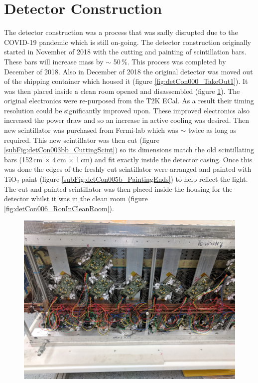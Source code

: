 \section{Detector Construction}\label{sec:DetectorConstruction}
The detector construction was a process that was sadly disrupted due to the COVID-19 pandemic which is still on-going. The detector construction originally started in November of 2018 with the cutting and painting of scintillation bars. These bars will increase mass by $\sim$ 50\,\%. This process was completed by December of 2018. Also in December of 2018 the original detector was moved out of the shipping container which housed it (figure \ref{fig:detCon000_TakeOut1}). It was then placed inside a clean room opened and disassembled (figure \ref{fig:detCon002_OldTearAway}). The original electronics were re-purposed from the T2K ECal. As a result their timing resolution could be significantly improved upon. These improved electronics also increased the power draw and so an increase in active cooling was desired. Then new scintillator was purchased from Fermi-lab which was $\sim$ twice as long as required. This new scintillator was then cut (figure \ref{subFig:detCon003bb_CuttingScint}) so its dimensions match the old scintillating bars (152\,cm $\times$ 4\,cm $\times$ 1\,cm) and fit exactly inside the detector casing. Once this was done the edges of the freshly cut scintillator were arranged and painted with TiO$_2$ paint (figure \ref{subFig:detCon005b_PaintingEnds}) to help reflect the light. The cut and painted scintillator was then placed inside the housing for the detector  whilst it was in the clean room (figure \ref{fig:detCon006_RonInCleanRoom}).

\begin{figure}[htbp]
\centering
\includegraphics[width=0.8\linewidth]{Chapter3/Figs/Raster/detCon002_OldTearAway.png}
\label{fig:detCon002_OldTearAway}
\end{figure}

